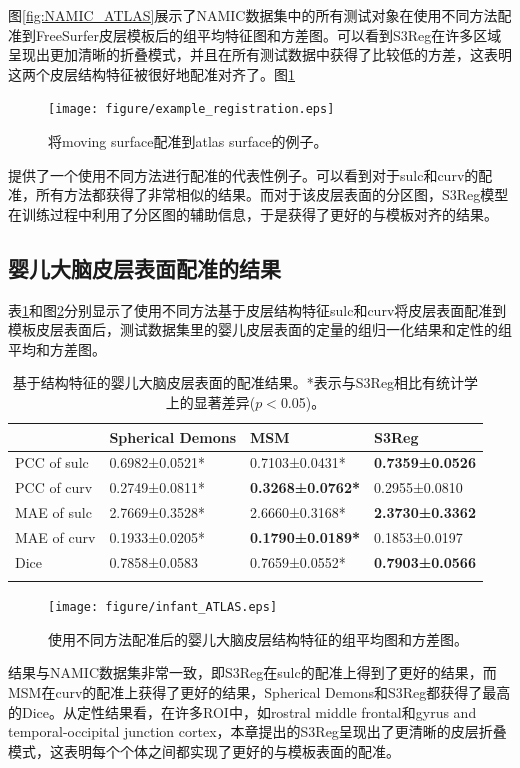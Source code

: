 图\ref{fig:NAMIC_ATLAS}展示了NAMIC数据集中的所有测试对象在使用不同方法配准到FreeSurfer皮层模板后的组平均特征图和方差图。可以看到S3Reg在许多区域呈现出更加清晰的折叠模式，并且在所有测试数据中获得了比较低的方差，这表明这两个皮层结构特征被很好地配准对齐了。图\ref{fig:example_registration}
\begin{figure}[h]
	\centering
	\texttt{[image: figure/example\_registration.eps]}
	\caption{将moving surface配准到atlas surface的例子。}
	\label{fig:example_registration}
\end{figure}
提供了一个使用不同方法进行配准的代表性例子。可以看到对于sulc和curv的配准，所有方法都获得了非常相似的结果。而对于该皮层表面的分区图，S3Reg模型在训练过程中利用了分区图的辅助信息，于是获得了更好的与模板对齐的结果。


\subsection{婴儿大脑皮层表面配准的结果}
表\ref{tab:婴儿皮层表面的配准结果}和图\ref{fig:infant_ATLAS}分别显示了使用不同方法基于皮层结构特征sulc和curv将皮层表面配准到模板皮层表面后，测试数据集里的婴儿皮层表面的定量的组归一化结果和定性的组平均和方差图。
\begin{table}[h]
	\caption{基于结构特征的婴儿大脑皮层表面的配准结果。*表示与S3Reg相比有统计学上的显著差异($p<$0.05)。}
	\label{tab:婴儿皮层表面的配准结果}
	\centering
	\begin{tabularx}{0.9\columnwidth}{X<{\centering} X<{\centering} X<{\centering} X<{\centering}}
		\Xhline{2\arrayrulewidth}
			& Spherical Demons &	MSM	& S3Reg  \\
		\hline
			PCC of sulc &	0.6982±0.0521* &	0.7103±0.0431*  &	\textbf{0.7359±0.0526}  \\
			PCC of curv &	0.2749±0.0811*	&  \textbf{0.3268±0.0762*}  &	0.2955±0.0810\\
			MAE of sulc &	2.7669±0.3528* &	2.6660±0.3168* &	\textbf{2.3730±0.3362}  \\
			MAE of curv &	0.1933±0.0205* &	\textbf{0.1790±0.0189*} &	0.1853±0.0197\\
			Dice&	0.7858±0.0583 &	0.7659±0.0552* &	\textbf{0.7903±0.0566} \\		
		\Xhline{2\arrayrulewidth}
	\end{tabularx}
\end{table}
\begin{figure}[h]
	\centering
	\texttt{[image: figure/infant\_ATLAS.eps]}
	\caption{使用不同方法配准后的婴儿大脑皮层结构特征的组平均图和方差图。}
	\label{fig:infant_ATLAS}
\end{figure}
结果与NAMIC数据集非常一致，即S3Reg在sulc的配准上得到了更好的结果，而MSM在curv的配准上获得了更好的结果，Spherical Demons和S3Reg都获得了最高的Dice。从定性结果看，在许多ROI中，如rostral middle frontal和gyrus and temporal-occipital junction cortex，本章提出的S3Reg呈现出了更清晰的皮层折叠模式，这表明每个个体之间都实现了更好的与模板表面的配准。


